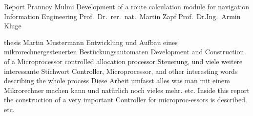 



													{Report }																			%
													{Prannoy Mulmi}														%
													{Development of a route calculation
													module for navigation }											  %
													{Information Engineering}						%
													{Prof.\ Dr.\ rer.\ nat.\ Martin Zapf}					%
													{Prof.\ Dr.\-Ing.\ Armin Kluge}								%
													

													{thesis}																			%
													{Martin Mustermann}														%
													{Entwicklung und Aufbau eines 
													 mikrorechnergesteuerten 
													 Best\"uckungsautomaten}											  %
													{Development and Construction of a Microprocessor 
													controlled allocation processor}							%
													{Steuerung, und viele weitere interessante 
													Stichwort}																		%
													{Controller, Microprocessor, and other 
													interesting words describing the whole 
													process}																			%
													{Diese Arbeit umfasst alles was man mit einem 
													Mikrorechner machen kann und nat\"urlich noch vieles mehr.
													etc.}																					%
													{Inside this report the construction of a very 
													important Controller for microproc-essors is 
													described.												
													etc.}																			%

